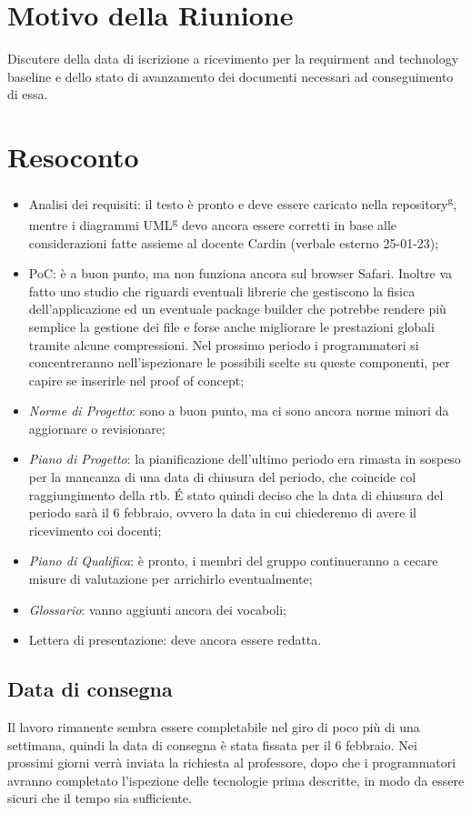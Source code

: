 \section{Motivo della Riunione}
Discutere della data di iscrizione a ricevimento per la requirment and technology baseline e dello stato di avanzamento dei documenti necessari ad conseguimento di essa.
\section{Resoconto}
\begin{itemize}
	\item Analisi dei requisiti: il testo è pronto e deve essere caricato nella repository\textsuperscript{g}, mentre i diagrammi UML\textsuperscript{g} devo ancora essere corretti in base alle considerazioni fatte assieme al docente Cardin (verbale esterno 25-01-23);
	
	\item PoC: è a buon punto, ma non funziona ancora sul browser Safari. Inoltre va fatto uno studio che riguardi eventuali librerie che gestiscono la fisica dell'applicazione ed un eventuale package builder che potrebbe rendere più semplice la gestione dei file e forse anche migliorare le prestazioni globali tramite alcune compressioni. Nel prossimo periodo i programmatori si concentreranno nell'ispezionare le possibili scelte su queste componenti, per capire se inserirle nel proof of concept;
	
	\item \textit{Norme di Progetto}: sono a buon punto, ma ci sono ancora norme minori da aggiornare o revisionare;
	
	\item \textit{Piano di Progetto}: la pianificazione dell'ultimo periodo era rimasta in sospeso per la mancanza di una data di chiusura del periodo, che coincide col raggiungimento della rtb. É stato quindi deciso che la data di chiusura del periodo sarà il 6 febbraio, ovvero la data in cui chiederemo di avere il ricevimento coi docenti;
	
	\item \textit{Piano di Qualifica}: è pronto, i membri del gruppo continueranno a cecare misure di valutazione per arrichirlo eventualmente;
	
	\item \textit{Glossario}: vanno aggiunti ancora dei vocaboli;

	\item Lettera di presentazione: deve ancora essere redatta.
\end{itemize}

\subsection{Data di consegna}
Il lavoro rimanente sembra essere completabile nel giro di poco più di una settimana, quindi la data di consegna è stata fissata per il 6 febbraio. 
\newline Nei prossimi giorni verrà inviata la richiesta al professore, dopo che i programmatori avranno completato l'ispezione delle tecnologie prima descritte, in modo da essere sicuri che il tempo sia sufficiente.
